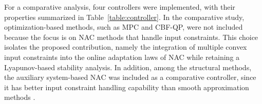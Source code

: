 \documentclass[letterpaper, journal]{IEEEtran}
\providecommand{\DIFdelbegin}{} %
\providecommand{\DIFdelend}{} %
\begin{document}
\hfill


\DIFdelbegin %

\DIFdelend For a comparative analysis, four controllers were implemented, with their properties summarized in Table~\ref{table:controller}.
In the comparative study, optimization-based methods, such as MPC and CBF-QP, were not included because the focus is on NAC methods that handle input constraints.
This choice isolates the proposed contribution, namely the integration of multiple convex input constraints into the online adaptation laws of NAC while retaining a Lyapunov-based stability analysis.
In addition, among the structural methods, the auxiliary system-based NAC was included as a comparative controller, since it has better input constraint handling capability than smooth approximation methods \cite{Min:2021aa}.
\end{document}
